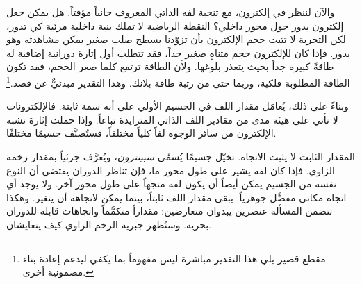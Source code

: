 والآن لننظر في إلكترون، مع تنحية لفه الذاتي المعروف جانباً مؤقتاً. هل يمكن جعل إلكترون يدور حول محور داخلي؟ النقطة الرياضية لا تملك بنية داخلية مرئية كي تدور، لكن التجربة لا تثبت حجم الإلكترون بأن تزوّدنا بسطح صلب صغير يمكن مشاهدته وهو يدور. فإذا كان للإلكترون حجم متناهٍ صغير جداً، فقد تتطلب أول إثارة دورانية إضافية له طاقةً كبيرة جداً بحيث يتعذر بلوغها. ولأن الطاقة ترتفع كلما صغر الحجم، فقد تكون الطاقة المطلوبة فلكية، وربما حتى من رتبة طاقة بلانك. وهذا التقدير مبدئيٌّ عن قصد.\footnote{مقطع قصير يلي هذا التقدير مباشرة ليس مفهوماً بما يكفي ليدعم إعادة بناء مضمونية أخرى.}

وبناءً على ذلك، يُعامَل مقدار اللف في الجسيم الأولي على أنه سمة ثابتة. فالإلكترونات لا تأتي على هيئة مدى من مقادير اللف الذاتي المتزايدة تباعاً. وإذا حملت إثارة تشبه الإلكترون من سائر الوجوه لفاً كلياً مختلفاً، فستُصنَّف جسيمًا مختلفًا.

المقدار الثابت لا يثبت الاتجاه. تخيّل جسيمًا يُسمّى \emph{سبينترون}، ويُعرَّف جزئياً بمقدار زخمه الزاوي. فإذا كان لفه يشير على طول محور ما، فإن تناظر الدوران يقتضي أن النوع نفسه من الجسيم يمكن أيضاً أن يكون لفه متجهاً على طول محور آخر. ولا يوجد أي اتجاه مكاني مفضَّل جوهرياً. يبقى مقدار اللف ثابتاً، بينما يمكن لاتجاهه أن يتغير. وهكذا تتضمن المسألة عنصرين يبدوان متعارضين: مقداراً متكمَّماً واتجاهات قابلة للدوران بحرية. وستُظهر جبرية الزخم الزاوي كيف يتعايشان.

\begin{classroomqa}
\end{classroomqa}


